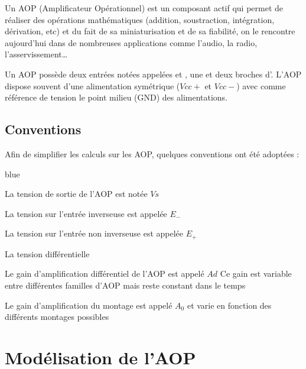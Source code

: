 
Un AOP (Amplificateur Opérationnel) est un composant actif qui permet de réaliser des opérations mathématiques (addition, soustraction, intégration, dérivation, etc) et du fait de sa miniaturisation et de sa fiabilité, on le rencontre aujourd’hui dans de nombreuses applications comme l’audio, la radio, l’asservissement…


Un AOP possède deux entrées notées appelées  et , une 
 et deux broches d’.
L’AOP dispose souvent d’une alimentation symétrique ($Vcc+$ et $Vcc-$) avec comme référence de tension le point milieu 
(GND) des alimentations.




\section{Conventions}


Afin de simplifier les calculs sur les AOP, quelques conventions ont été adoptées :

\begin{items}{blue}{\Triangle}
  \item La tension de sortie de l’AOP est notée $Vs$
  \item La tension sur l’entrée inverseuse est appelée $E_-$
  \item La tension sur l’entrée non inverseuse est appelée $E_+$
  \item La tension différentielle 
  \item Le gain d’amplification différentiel de l’AOP est appelé $Ad$
  Ce gain est variable entre différentes familles d’AOP mais reste constant dans le temps
  \item Le gain d’amplification du montage est appelé $A_0$ et varie en fonction des différents montages possibles 
\end{items}

\chapter{Modélisation de l'AOP}
